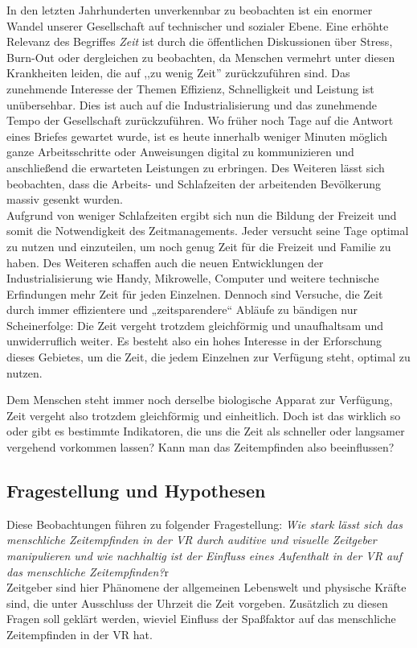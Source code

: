 \documentclass{Paper}
\begin{document}
In den letzten Jahrhunderten unverkennbar zu beobachten ist ein enormer Wandel unserer Gesellschaft auf technischer und sozialer Ebene. Eine erhöhte Relevanz des Begriffes \textit{Zeit} ist durch die öffentlichen Diskussionen über Stress, Burn-Out oder dergleichen zu beobachten, da Menschen vermehrt unter diesen Krankheiten leiden, die auf ,,zu wenig Zeit'' zurückzuführen sind. Das zunehmende Interesse der Themen Effizienz, Schnelligkeit und Leistung ist unübersehbar. 
Dies ist auch auf die Industrialisierung und das zunehmende Tempo der Gesellschaft zurückzuführen. \cite{Wallish2003} Wo früher noch Tage auf die Antwort eines Briefes gewartet wurde, ist es heute innerhalb weniger Minuten möglich ganze Arbeitsschritte oder Anweisungen digital zu kommunizieren und anschließend die erwarteten Leistungen zu erbringen.
Des Weiteren lässt sich beobachten, dass die Arbeits- und Schlafzeiten der arbeitenden Bevölkerung massiv gesenkt wurden. \cite{DeutscheSozialgeschichte}
\\
Aufgrund von weniger Schlafzeiten ergibt sich nun die Bildung der Freizeit und somit die Notwendigkeit des Zeitmanagements. Jeder versucht seine Tage optimal zu nutzen und einzuteilen, um noch genug Zeit für die Freizeit und Familie zu haben. Des Weiteren schaffen auch die neuen Entwicklungen der Industrialisierung wie Handy, Mikrowelle, Computer und weitere technische Erfindungen mehr Zeit für jeden Einzelnen. Dennoch sind Versuche, die Zeit durch immer effizientere und „zeitsparendere“ Abläufe zu bändigen nur Scheinerfolge: Die Zeit vergeht trotzdem gleichförmig und unaufhaltsam und unwiderruflich weiter. \cite{Wallish2003} Es besteht also ein hohes Interesse in der Erforschung dieses Gebietes, um die Zeit, die jedem Einzelnen zur Verfügung steht, optimal zu nutzen.

Dem Menschen steht immer noch derselbe biologische Apparat zur Verfügung, Zeit vergeht also trotzdem gleichförmig und einheitlich. Doch ist das wirklich so oder gibt es bestimmte Indikatoren, die uns die Zeit als schneller oder langsamer vergehend vorkommen lassen? Kann man das Zeitempfinden also beeinflussen?

\subsection{Fragestellung und Hypothesen}

Diese Beobachtungen führen zu folgender Fragestellung: 
\textit{Wie stark lässt sich das menschliche Zeitempfinden in der VR durch auditive und visuelle Zeitgeber manipulieren und wie nachhaltig ist der Einfluss eines Aufenthalt in der VR auf das menschliche Zeitempfinden?}r\\
Zeitgeber sind hier Phänomene der allgemeinen Lebenswelt und physische Kräfte sind, die unter Ausschluss der Uhrzeit die Zeit vorgeben.
Zusätzlich zu diesen Fragen soll geklärt werden, wieviel Einfluss der Spaßfaktor auf das menschliche Zeitempfinden in der VR hat. 
\end{document}
